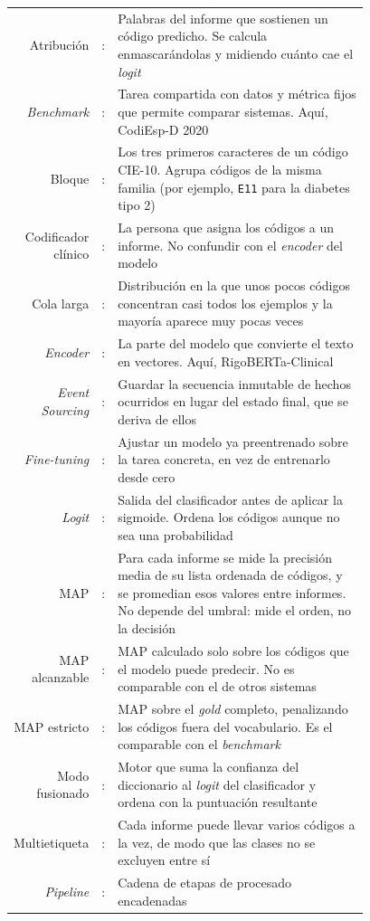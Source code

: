 \begin{tabular}{r r p{0.78\linewidth}}
Atribución & : & Palabras del informe que sostienen un código predicho. Se calcula enmascarándolas y midiendo cuánto cae el \emph{logit} \\
\emph{Benchmark} & : & Tarea compartida con datos y métrica fijos que permite comparar sistemas. Aquí, CodiEsp-D 2020 \\
Bloque & : & Los tres primeros caracteres de un código CIE-10. Agrupa códigos de la misma familia (por ejemplo, \texttt{E11} para la diabetes tipo 2) \\
Codificador clínico & : & La persona que asigna los códigos a un informe. No confundir con el \emph{encoder} del modelo \\
Cola larga & : & Distribución en la que unos pocos códigos concentran casi todos los ejemplos y la mayoría aparece muy pocas veces \\
\emph{Encoder} & : & La parte del modelo que convierte el texto en vectores. Aquí, RigoBERTa-Clinical \\
\emph{Event Sourcing} & : & Guardar la secuencia inmutable de hechos ocurridos en lugar del estado final, que se deriva de ellos \\
\emph{Fine-tuning} & : & Ajustar un modelo ya preentrenado sobre la tarea concreta, en vez de entrenarlo desde cero \\
\emph{Logit} & : & Salida del clasificador antes de aplicar la sigmoide. Ordena los códigos aunque no sea una probabilidad \\
MAP & : & Para cada informe se mide la precisión media de su lista ordenada de códigos, y se promedian esos valores entre informes. No depende del umbral: mide el orden, no la decisión \\
MAP alcanzable & : & MAP calculado solo sobre los códigos que el modelo puede predecir. No es comparable con el de otros sistemas \\
MAP estricto & : & MAP sobre el \emph{gold} completo, penalizando los códigos fuera del vocabulario. Es el comparable con el \emph{benchmark} \\
Modo fusionado & : & Motor que suma la confianza del diccionario al \emph{logit} del clasificador y ordena con la puntuación resultante \\
Multietiqueta & : & Cada informe puede llevar varios códigos a la vez, de modo que las clases no se excluyen entre sí \\
\emph{Pipeline} & : & Cadena de etapas de procesado encadenadas \\

\end{tabular}
